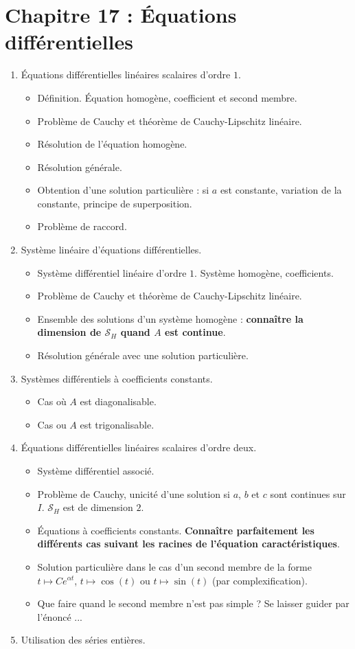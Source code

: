 \documentclass[twoside,a4paper,french,10pt]{VcCours}
\begin{document}
\section*{Chapitre 17 : Équations différentielles}
\begin{enumerate}
\item Équations différentielles linéaires scalaires d'ordre $1$.
\begin{itemize}
\item Définition. Équation homogène, coefficient et second membre.
\item Problème de Cauchy et théorème de Cauchy-Lipschitz linéaire.
\item Résolution de l'équation homogène.
\item Résolution générale.
\item Obtention d'une solution particulière : si $a$ est constante, variation de la constante, principe de superposition.
\item Problème de raccord.
\end{itemize}
\item Système linéaire d'équations différentielles.
\begin{itemize}
\item Système différentiel linéaire d'ordre $1$. Système homogène, coefficients.
\item Problème de Cauchy et théorème de Cauchy-Lipschitz linéaire.
\item Ensemble des solutions d'un système homogène : \textbf{connaître la dimension de $\mathcal{S}_H$ quand $A$ est continue}.
\item Résolution générale avec une solution particulière.
\end{itemize}
\item Systèmes différentiels à coefficients constants.
\begin{itemize}
\item Cas où $A$ est diagonalisable.
\item Cas ou $A$ est trigonalisable.
\end{itemize}
\item Équations différentielles linéaires scalaires d'ordre deux.
\begin{itemize}
\item Système différentiel associé.
\item Problème de Cauchy, unicité d'une solution si $a$, $b$ et $c$ sont continues sur $I$. $\mathcal{S}_H$ est de dimension $2$.
\item Équations à coefficients constants. \textbf{Connaître parfaitement les différents cas suivant les racines de l'équation caractéristiques}.
\item Solution particulière dans le cas d'un second membre de la forme $t \mapsto C e^{\alpha t}$, $t \mapsto \cos(t)$ ou $t \mapsto \sin(t)$ (par complexification).
\item Que faire quand le second membre n'est pas simple ? Se laisser guider par l'énoncé ...
\end{itemize}
\item Utilisation des séries entières. 
\end{enumerate}
    
\end{document}
